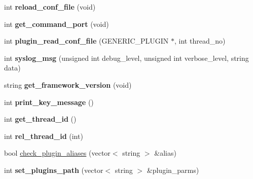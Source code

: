 \begin{DoxyCompactItemize}
\item 
\hypertarget{classgeneric__server_af0e2bacfbff7810aef296fd19e4f180b}{int {\bfseries reload\-\_\-conf\-\_\-file} (void)}\label{classgeneric__server_af0e2bacfbff7810aef296fd19e4f180b}

\item 
\hypertarget{classgeneric__server_acfccaf0c7a1e0bea1d005d34fab283ed}{int {\bfseries get\-\_\-command\-\_\-port} (void)}\label{classgeneric__server_acfccaf0c7a1e0bea1d005d34fab283ed}

\item 
\hypertarget{classgeneric__server_a67de9c7251b5cd29f4b3e411455df973}{int {\bfseries plugin\-\_\-read\-\_\-conf\-\_\-file} (G\-E\-N\-E\-R\-I\-C\-\_\-\-P\-L\-U\-G\-I\-N $\ast$, int thread\-\_\-no)}\label{classgeneric__server_a67de9c7251b5cd29f4b3e411455df973}

\item 
\hypertarget{classgeneric__server_ac1732bb9db8bdc382c8268e209c9841c}{int {\bfseries syslog\-\_\-msg} (unsigned int debug\-\_\-level, unsigned int verbose\-\_\-level, string data)}\label{classgeneric__server_ac1732bb9db8bdc382c8268e209c9841c}

\item 
\hypertarget{classgeneric__server_aaa0eaebac64692bb4ad085f9a870cd41}{string {\bfseries get\-\_\-framework\-\_\-version} (void)}\label{classgeneric__server_aaa0eaebac64692bb4ad085f9a870cd41}

\item 
\hypertarget{classgeneric__server_a1475cf57af52277df14d035ec6116cc4}{int {\bfseries print\-\_\-key\-\_\-message} ()}\label{classgeneric__server_a1475cf57af52277df14d035ec6116cc4}

\item 
\hypertarget{classgeneric__server_aa4706f1173f057b11c33c249465632d0}{int {\bfseries get\-\_\-thread\-\_\-id} ()}\label{classgeneric__server_aa4706f1173f057b11c33c249465632d0}

\item 
\hypertarget{classgeneric__server_a3a06c104224dcd1b6c950e08d357e9e0}{int {\bfseries rel\-\_\-thread\-\_\-id} (int)}\label{classgeneric__server_a3a06c104224dcd1b6c950e08d357e9e0}

\item 
bool \hyperlink{classgeneric__server_a4f1cd298834c12d725808673a1b89f5b}{check\-\_\-plugin\-\_\-aliases} (vector$<$ string $>$ \&alias)
\item 
\hypertarget{classgeneric__server_ae4c64f85fe50f42c829e97c6f08a8923}{int {\bfseries set\-\_\-plugins\-\_\-path} (vector$<$ string $>$ \&plugin\-\_\-parms)}\label{classgeneric__server_ae4c64f85fe50f42c829e97c6f08a8923}


\end{DoxyCompactItemize}
